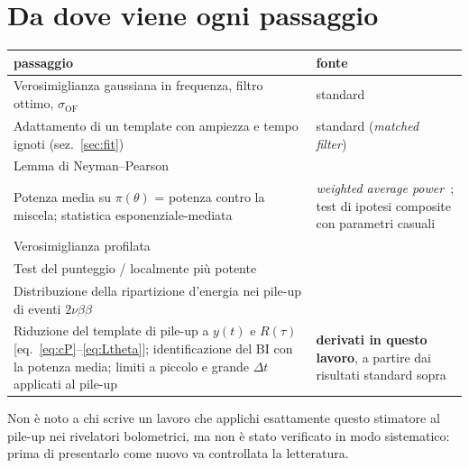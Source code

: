 \documentclass[11pt,a4paper]{article}
\newcommand{\dt}{\Delta t}
\begin{document}
\section{Da dove viene ogni passaggio}
\label{sec:fonti}
\begin{center}
\begin{tabular}{p{}p{}}
\toprule
passaggio & fonte \\
\midrule
Verosimiglianza gaussiana in frequenza, filtro ottimo, $\sigma_\mathrm{OF}$
  & standard~\cite{GattiManfredi1986,Kay1998,Alduino2016} \\
Adattamento di un template con ampiezza e tempo ignoti (sez.~\ref{sec:fit})
  & standard (\emph{matched filter})~\cite{Kay1998,VanTrees1968} \\
Lemma di Neyman--Pearson & \cite{NP1933} \\
Potenza media su $\pi(\theta)$ = potenza contro la miscela; statistica esponenziale-mediata
  & \emph{weighted average power}~\cite{Wald1943,AndrewsPloberger1994}; test di ipotesi composite
  con parametri casuali~\cite{VanTrees1968,Kay1998} \\
Verosimiglianza profilata & \cite{CCGV2011} \\
Test del punteggio / localmente più potente & \cite{CoxHinkley1974} \\
Distribuzione della ripartizione d'energia nei pile-up di eventi $2\nu\beta\beta$ & \cite{Chernyak2012} \\
\midrule
Riduzione del template di pile-up a $y(t)$ e $R(\tau)$ [eq.~\eqref{eq:cP}--\eqref{eq:Ltheta}];
  identificazione del BI con la potenza media; limiti a piccolo e grande $\dt$ applicati al pile-up
  & \textbf{derivati in questo lavoro}, a partire dai risultati standard sopra \\
\bottomrule
\end{tabular}
\end{center}
Non è noto a chi scrive un lavoro che applichi esattamente questo stimatore al pile-up nei
rivelatori bolometrici, ma non è stato verificato in modo sistematico: prima di presentarlo come
nuovo va controllata la letteratura.

\appendix
\end{document}
